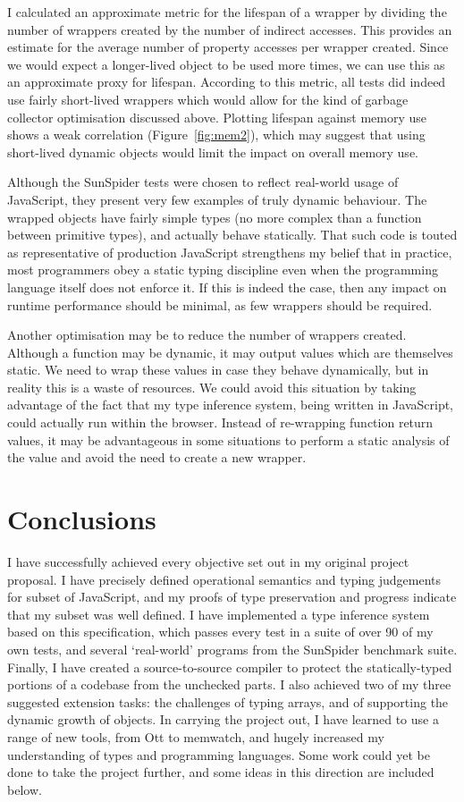 \documentclass[12pt,a4paper,twoside,openright]{report}
\theoremstyle{definition}
\theoremstyle{dotless}
\begin{document}
I calculated an approximate metric for the lifespan of a wrapper by dividing
the number of wrappers created by the number of indirect accesses.  This
provides an estimate for the average number of property accesses per wrapper
created. Since we would expect a longer-lived object to be used more times, we
can use this as an approximate proxy for lifespan. According to this metric,
all tests did indeed use fairly short-lived wrappers which would allow for the
kind of garbage collector optimisation discussed above. Plotting lifespan
against memory use shows a weak correlation (Figure~\ref{fig:mem2}), which may
suggest that using short-lived dynamic objects would limit the impact on
overall memory use.

Although the SunSpider tests were chosen to reflect real-world usage of
JavaScript, they present very few examples of truly dynamic behaviour.
The wrapped objects have fairly simple types (no 
more complex than a function between primitive types), and actually behave 
statically. That such code is touted as representative of
production JavaScript strengthens my belief that in practice, most programmers obey a 
static typing discipline even when the programming language itself does not enforce it.
If this is indeed the case, then any impact on runtime performance should be minimal,
as few wrappers should be required.

Another optimisation may be to reduce the number of wrappers created. Although a
function may be dynamic, it may output values which are themselves static. We need to
wrap these values in case they behave dynamically, but in reality this is a waste of 
resources. We could avoid this situation by taking advantage of the fact that my type inference 
system, being written in JavaScript, could actually run within the browser. Instead of re-wrapping
function return values, it may be advantageous in some situations to perform a static analysis
of the value and avoid the need to create a new wrapper.

\chapter{Conclusions}

I have successfully achieved every objective set out in my original project
proposal.  I have precisely defined operational semantics and typing judgements
for subset of JavaScript, and my proofs of type preservation and progress
indicate that my subset was well defined.  I have implemented a type inference
system based on this specification, which passes every test in a suite of over
90 of my own tests, and several `real-world' programs from the SunSpider
benchmark suite. Finally, I have created a source-to-source compiler to
protect the statically-typed portions of a codebase from the unchecked parts. I
also achieved two of my three suggested extension tasks: the challenges of
typing arrays, and of supporting the dynamic growth of objects. In carrying the
project out, I have learned to use a range of new tools, from Ott to memwatch,
and hugely increased my understanding of types and programming languages. Some
work could yet be done to take the project further, and some ideas in this
direction are included below.
\end{document}
